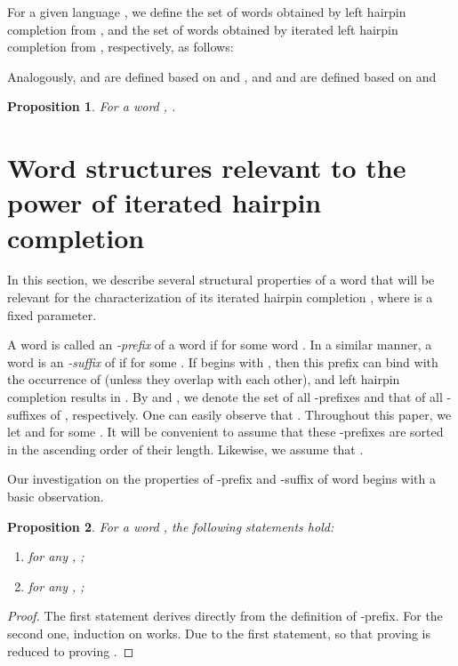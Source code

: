 \documentclass{article}
\theoremstyle{plain}
\newtheorem{proposition}{Proposition}
\theoremstyle{remark}
\begin{document}
For a given language , we define the set of words obtained by left hairpin completion from , and the set of words obtained by iterated left hairpin completion from , respectively, as follows: 

Analogously,  and  are defined based on  and , and  and  are defined based on  and 

\begin{proposition}\label{prop:presentation_RH}
	For a word , . 
\end{proposition}


\section{Word structures relevant to the power of iterated hairpin completion}
	\label{sec:apref_casuf}

In this section, we describe several structural properties of a word  that will be relevant for the characterization of its iterated hairpin completion , where  is a fixed parameter. 

A word  is called an {\it -prefix} of a word  if  for some word . 
In a similar manner, a word  is an {\it -suffix} of  if  for some . 
If  begins with , then this prefix can bind with the occurrence of  (unless they overlap with each other), and left hairpin completion results in . 
By  and , we denote the set of all -prefixes and that of all -suffixes of , respectively. 
One can easily observe that . 
Throughout this paper, we let  and  for some . 
It will be convenient to assume that these -prefixes are sorted in the ascending order of their length. 
Likewise, we assume that . 

Our investigation on the properties of -prefix and -suffix of word begins with a basic observation. 

\begin{proposition}\label{prop:aprefix_basic}
	For a word , the following statements hold: 
	\begin{enumerate}
	\item	for any , ; 
	\item	for any , ; 
\end{enumerate}
\end{proposition}
\begin{proof}
	The first statement derives directly from the definition of -prefix. 
	For the second one, induction on  works. 
	Due to the first statement,  so that proving  is reduced to proving . 
\end{proof}
\end{document}
